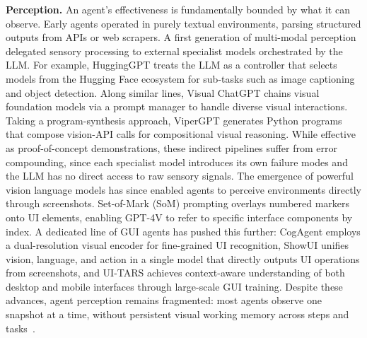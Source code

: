 \textbf{Perception.} An agent's effectiveness is fundamentally bounded by what it can observe. Early agents operated in purely textual environments, parsing structured outputs from APIs or web scrapers. A first generation of multi-modal perception delegated sensory processing to external specialist models orchestrated by the LLM. For example, HuggingGPT \cite{shen2023hugginggpt} treats the LLM as a controller that selects models from the Hugging Face ecosystem for sub-tasks such as image captioning and object detection. Along similar lines, Visual ChatGPT \cite{wu2023visual} chains visual foundation models via a prompt manager to handle diverse visual interactions. Taking a program-synthesis approach, ViperGPT \cite{suris2023vipergpt} generates Python programs that compose vision-API calls for compositional visual reasoning. While effective as proof-of-concept demonstrations, these indirect pipelines suffer from error compounding, since each specialist model introduces its own failure modes and the LLM has no direct access to raw sensory signals. The emergence of powerful vision language models has since enabled agents to perceive environments directly through screenshots. Set-of-Mark (SoM) prompting \cite{yang2023set} overlays numbered markers onto UI elements, enabling GPT-4V to refer to specific interface components by index. A dedicated line of GUI agents has pushed this further: CogAgent \cite{hong2024cogagent} employs a dual-resolution visual encoder for fine-grained UI recognition, ShowUI \cite{lin2025showui} unifies vision, language, and action in a single model that directly outputs UI operations from screenshots, and UI-TARS \cite{qin2025ui} achieves context-aware understanding of both desktop and mobile interfaces through large-scale GUI training. Despite these advances, agent perception remains fragmented: most agents observe one snapshot at a time, without persistent visual working memory across steps and tasks~\citep{guo2026mcp,ahn2026orchestrationbench,ding2026wildclawbench,hu2026agentic,li2026benchmark,koh2024visualwebarena,rawles2025androidworld,wang2024mobile,zhang2025appagent,cheng2024seeclick,10.1145/3690642,dong2026deep, zhang2026ssrb, huang2025deepresearchguard}.

